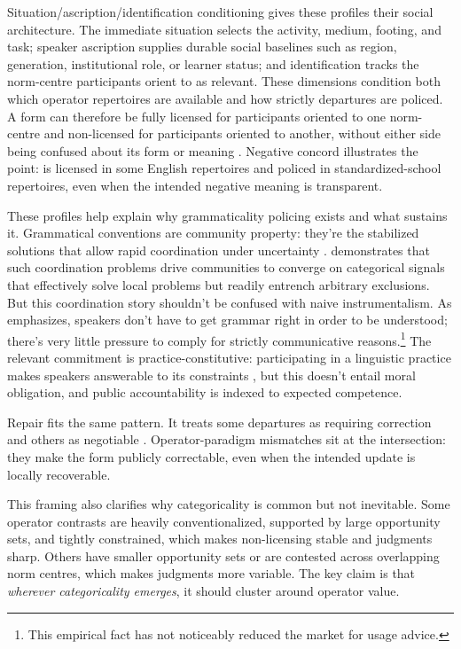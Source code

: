 \documentclass[12pt,letterpaper]{article}
\begin{document}
Situation/ascription/identification conditioning gives these profiles their social architecture. The immediate situation selects the activity, medium, footing, and task; speaker ascription supplies durable social baselines such as region, generation, institutional role, or learner status; and identification tracks the norm-centre participants orient to as relevant. These dimensions condition both which operator repertoires are available and how strictly departures are policed. A form can therefore be fully licensed for participants oriented to one norm-centre and non-licensed for participants oriented to another, without either side being confused about its form or meaning \citep{reynolds2026varieties}. Negative concord illustrates the point:  is licensed in some English repertoires and policed in standardized-school repertoires, even when the intended negative meaning is transparent.

These profiles help explain why grammaticality policing exists and what sustains it. Grammatical conventions are community property: they're the stabilized solutions that allow rapid coordination under uncertainty \citep{clarkbrennan1991,stalnaker2002}. \textcite{oconnor2019} demonstrates that such coordination problems drive communities to converge on categorical signals that effectively solve local problems but readily entrench arbitrary exclusions. But this coordination story shouldn't be confused with naive instrumentalism. As \textcite{pullum2019} emphasizes, speakers don't have to get grammar right in order to be understood; there's very little pressure to comply for strictly communicative reasons.\footnote{This empirical fact has not noticeably reduced the market for usage advice.} The relevant commitment is practice-constitutive: participating in a linguistic practice makes speakers answerable to its constraints \citep{millar2004}, but this doesn't entail moral obligation, and public accountability is indexed to expected competence.

Repair fits the same pattern. It treats some departures as requiring correction and others as negotiable \citep{schegloffjeffersonsacks1977}. Operator-paradigm mismatches sit at the intersection: they make the form publicly correctable, even when the intended update is locally recoverable.

{\sloppy This framing also clarifies why categoricality is common but not inevitable. Some operator contrasts are heavily conventionalized, supported by large opportunity sets, and tightly constrained, which makes non-licensing stable and judgments sharp. Others have smaller opportunity sets or are contested across overlapping norm centres, which makes judgments more variable. The key claim is that \emph{wherever categoricality emerges}, it should cluster around operator value.\par}
\end{document}
